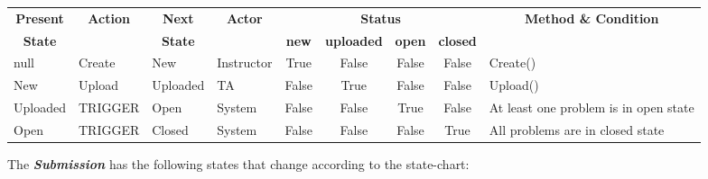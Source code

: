 \documentclass{article}
\begin{document}
\begin{enumerate}
\begin{center}
\begin{scriptsize}
\begin{tabular}{|l|l|l|l|c|c|c|c|l|} \hline
\multicolumn{1}{|c}{\bf Present} &
\multicolumn{1}{|c}{\bf Action} &
\multicolumn{1}{|c}{\bf Next} &
\multicolumn{1}{|c}{\bf Actor} &
\multicolumn{4}{|c}{\bf Status} &
\multicolumn{1}{|c|}{\bf Method \& Condition} \\ \cline{5-8}
\multicolumn{1}{|c}{\bf State} &
\multicolumn{1}{|c}{\bf } &
\multicolumn{1}{|c}{\bf State} &
\multicolumn{1}{|c}{\bf } &
\multicolumn{1}{|c}{\bf new} &
\multicolumn{1}{|c}{\bf uploaded} &
\multicolumn{1}{|c}{\bf open} &
\multicolumn{1}{|c}{\bf closed} &
\multicolumn{1}{|c|}{\bf } \\ \hline
null 				& Create 	& \textsf{New} 		& Instructor& True 	& False & False & False & Create() \\ \hline
\textsf{New} 		& Upload 	& \textsf{Uploaded}	& TA 		& False & True 	& False & False & Upload() \\ \hline
\textsf{Uploaded} 	& TRIGGER 	& \textsf{Open} 	& System 	& False & False	& True 	& False & At least one problem is in open state\\ \hline
\textsf{Open} 	& TRIGGER 	& \textsf{Closed} 		& System 	& False & False	& False & True & All problems are in closed state\\ \hline
\end{tabular}
\end{scriptsize}
\end{center}

The {\bf \em Submission} has the following states that change according to the state-chart:

\begin{center}
\begin{tabular}{|l|} \hline
\\ \hline
\end{tabular}
\end{center}


\end{enumerate}
\end{document}

